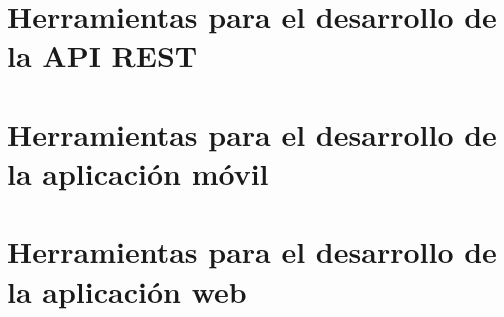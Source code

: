 
\appendix
\clearpage
\addappheadtotoc
\appendixpage


\chapter{Herramientas para el desarrollo de la API REST\label{anexo:api-rest}}



\chapter{Herramientas para el desarrollo de la aplicación móvil \label{anexo:app-android}}


\chapter{Herramientas para el desarrollo de la aplicación web\label{anexo:app-web}}


